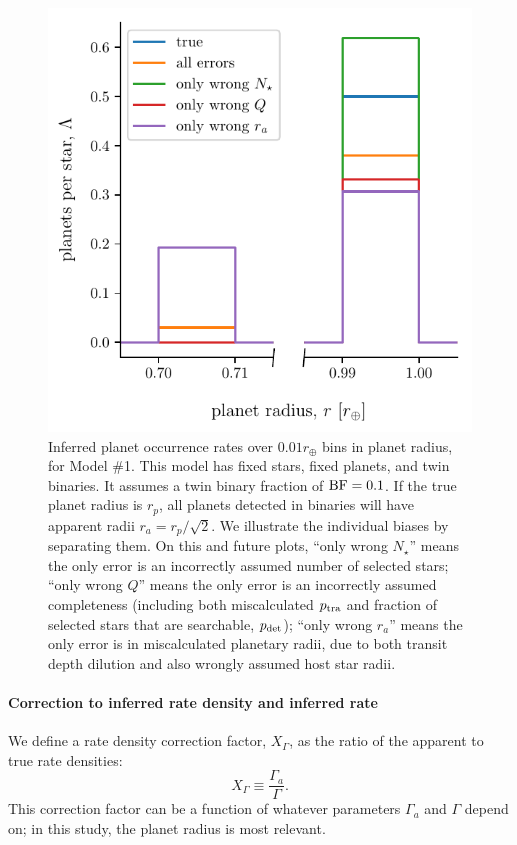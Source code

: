 \begin{figure}[!tb]
    \begin{center}
        \includegraphics[width=.6\textwidth]{figures/errcases_rate_density_vs_radius_model_1_brokenx.pdf}
    \end{center}
    \vspace{-0.5cm}
    \caption{
        Inferred planet occurrence rates over $0.01r_\oplus$ bins in planet 
        radius,
        for Model \#1.
        This model has fixed stars, fixed planets, and twin binaries. 
        It assumes a twin binary fraction of ${\rm BF}=0.1$.
        If the true planet radius is $r_p$, all planets 
        detected in binaries will have apparent radii $r_a = r_p/\sqrt{2}$.
        We illustrate the individual biases by separating them.
        On this and future plots,
        ``only wrong $N_\star$'' means the only error is an incorrectly 
        assumed 
        number of selected stars;
        ``only wrong $Q$'' means the only error is an incorrectly assumed 
        completeness (including both miscalculated $p_{\rm tra}$ 
        and fraction of selected stars that are searchable, $p_{\rm det}$);
        ``only wrong $r_a$'' means the only error is in miscalculated        
        planetary radii, due to both transit depth dilution and also wrongly 
        assumed host star radii.
    }
    \label{fig:errcases_model_1}
\end{figure}


\paragraph{Correction to inferred rate density and inferred rate}

We define a rate density correction factor, $X_\Gamma$, as the ratio of the 
apparent to true rate densities:
\begin{equation}
X_\Gamma \equiv \frac{\Gamma_a}{\Gamma}.
\end{equation}
This correction factor can be a function of whatever parameters $\Gamma_a$ and 
$\Gamma$ depend on; in this study, the planet radius is most relevant.

